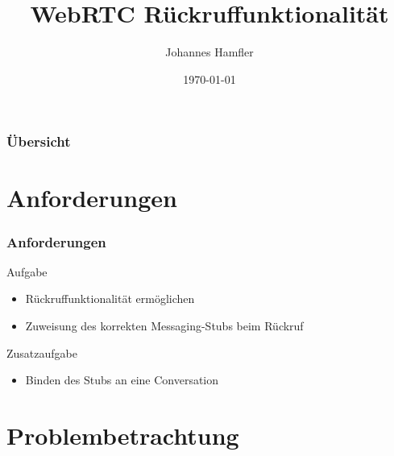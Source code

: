 \documentclass{beamer}
\title[WebRTC Rückruf]{WebRTC Rückruffunktionalität} %
\author{Johannes Hamfler} %
\institute[HfTL] %
{
Hochschule für Telekommunikation Leipzig \\ %
\medskip
\textit{johannes.hamfler@hftl.de} %
}
\date{\today} %
\begin{document}
\begin{frame}
\titlepage %
\end{frame}

\begin{frame}
\frametitle{Übersicht} %
\tableofcontents %
\end{frame}


\section{Anforderungen}
\begin{frame}
	\frametitle{Anforderungen}
	\begin{block}{Aufgabe}
		\begin{itemize}[<2->]
			\item Rückruffunktionalität ermöglichen
			\item Zuweisung des korrekten Messaging-Stubs beim Rückruf
		\end{itemize}
	\end{block}
	\begin{block}{Zusatzaufgabe}
		\begin{itemize}[<2->]
			\item Binden des Stubs an eine Conversation
		\end{itemize}
	\end{block}
	\pause
\end{frame}



\section{Problembetrachtung}
\end{document}
